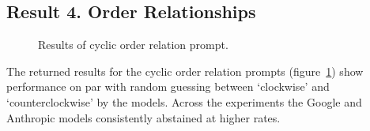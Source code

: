 \subsection{Result 4. Order Relationships}

\begin{figure}
    \centering
    
    \caption{Results of cyclic order relation prompt. }
    \label{fig:order}
\end{figure}

The returned results for the cyclic order relation prompts (figure~\ref{fig:order}) show performance on par with random guessing between `clockwise' and `counterclockwise' by the models.
Across the experiments the Google and Anthropic models consistently abstained at higher rates.











